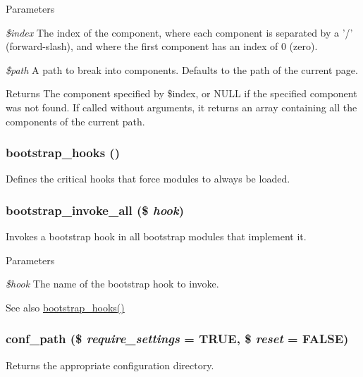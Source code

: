 \begin{DoxyParams}{Parameters}
\item[{\em \$index}]The index of the component, where each component is separated by a '/' (forward-\/slash), and where the first component has an index of 0 (zero). \item[{\em \$path}]A path to break into components. Defaults to the path of the current page.\end{DoxyParams}
\begin{DoxyReturn}{Returns}
The component specified by \$index, or NULL if the specified component was not found. If called without arguments, it returns an array containing all the components of the current path. 
\end{DoxyReturn}
\hypertarget{bootstrap_8inc_a7a24c0b200b76c22c63b99e935e1bd5a}{
\subsubsection[{bootstrap\_\-hooks}]{\setlength{\rightskip}{0pt plus 5cm}bootstrap\_\-hooks ()}}
\label{bootstrap_8inc_a7a24c0b200b76c22c63b99e935e1bd5a}
Defines the critical hooks that force modules to always be loaded. \hypertarget{bootstrap_8inc_a3f13159d2e93ecfd09823d8dca30f5d9}{
\subsubsection[{bootstrap\_\-invoke\_\-all}]{\setlength{\rightskip}{0pt plus 5cm}bootstrap\_\-invoke\_\-all (\$ {\em hook})}}
\label{bootstrap_8inc_a3f13159d2e93ecfd09823d8dca30f5d9}
Invokes a bootstrap hook in all bootstrap modules that implement it.


\begin{DoxyParams}{Parameters}
\item[{\em \$hook}]The name of the bootstrap hook to invoke.\end{DoxyParams}
\begin{DoxySeeAlso}{See also}
\hyperlink{bootstrap_8inc_a7a24c0b200b76c22c63b99e935e1bd5a}{bootstrap\_\-hooks()} 
\end{DoxySeeAlso}
\hypertarget{bootstrap_8inc_acef612ef19c49f6259531f0bee5c26cc}{
\subsubsection[{conf\_\-path}]{\setlength{\rightskip}{0pt plus 5cm}conf\_\-path (\$ {\em require\_\-settings} = {\ttfamily TRUE}, \/  \$ {\em reset} = {\ttfamily FALSE})}}
\label{bootstrap_8inc_acef612ef19c49f6259531f0bee5c26cc}
Returns the appropriate configuration directory.

